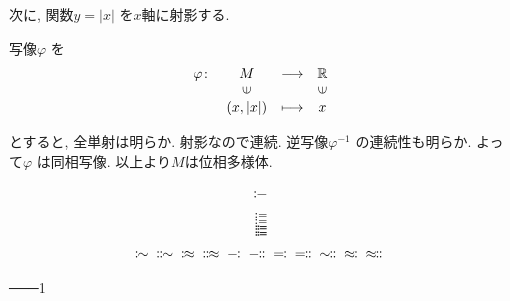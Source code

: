 \documentclass[dvipdfmx]{jsarticle}
\begin{document}
次に, 関数$y = |x|$ を$x$軸に射影する.

写像$\varphi$ を
\[\begin{array}{rccc}
\varphi \colon & M & \longrightarrow   & \mathbb{R} \\
        & \rotatebox{90}{$\in$} & & \rotatebox{90}{$\in$} \\
        & (x,|x|) & \longmapsto & x
\end{array}\]

とすると, 全単射は明らか. 射影なので連続. 逆写像$\varphi^{-1}$ の連続性も明らか. よって$\varphi$ は同相写像. 
以上より$M$は位相多様体.

\vspace{5zw}

{\HUGE
$$
\colondash
$$
$$
\coloneqq
$$
$$
\coloneq
$$
$$
\Coloneqq
$$
$$
\Coloneq
$$
$$
\colonsim \\
\Colonsim \\
\colonapprox \\
\Colonapprox \\
\dashcolon \\
\Dashcolon \\
\eqqcolon \\
\Eqqcolon \\
\Simcolon \\
\approxcolon \\
\Approxcolon \\
$$
}

───\textcircled{\scriptsize 1}

\newcommand{\mrk}[1]{
\raisebox{-3pt}{
\!\!
\begin{tikzpicture}[x=1pt,y=1pt,line width=1pt]
\draw (0,0) ellipse (4.5 and 6);
\draw (0,0) node{
\usefont{T1}{phv}{m}{n}
\fontsize{9pt}{0}
\selectfont #1 };
\end{tikzpicture}}}
\end{document}
